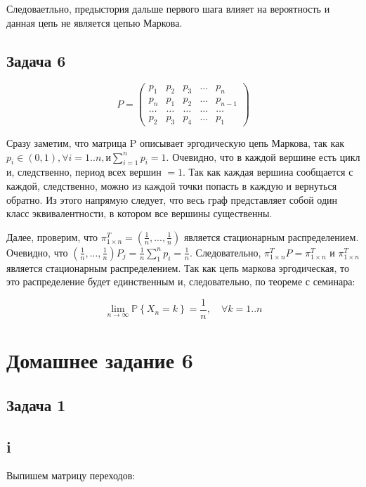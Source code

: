 \documentclass[a4paper,12pt]{article}
\begin{document}
Следоваетльно, предыстория дальше первого шага влияет на вероятность и данная цепь не является цепью Маркова.

\subsection{Задача 6}

\[
P=\left(\begin{array}{ccccc}{p_{1}} & {p_{2}} & {p_{3}} & {\dots} & {p_{n}} \\ {p_{n}} & {p_{1}} & {p_{2}} & {\dots} & {p_{n-1}} \\ {\dots} & {\dots} & {\dots} & {\dots} & {\dots} \\ {p_{2}} & {p_{3}} & {p_{4}} & {\dots} & {p_{1}}\end{array}\right)
\]

Сразу заметим, что матрица P описывает эргодическую цепь Маркова, так как $p_{i} \in(0,1), \forall i=1 . . n, \mathrm{и} \sum_{i=1}^{n} p_{i}=1$. Очевидно, что в каждой вершине есть цикл и, следственно, период всех вершин $ = 1 $. Так как каждая вершина сообщается с каждой, следственно, можно из каждой точки попасть в каждую и вернуться обратно. Из этого напрямую следует, что весь граф представляет собой один класс эквивалентности, в котором все вершины существенны. 

Далее, проверим, что $ \pi_{1\times n}^T = (\frac{1}{n}, ... , \frac{1}{n}) $ является стационарным распределением. Очевидно, что $ (\frac{1}{n}, ... , \frac{1}{n}) P_j = \frac{1}{n} \sum_{1}^{n} p_{i} = \frac{1}{n} $. Следовательно,  $ \pi_{1\times n}^T P =  \pi_{1\times n}^T $ и  $ \pi_{1\times n}^T $ является стационарным распределением. Так как цепь маркова эргодическая, то это распределение будет единственным и, следовательно, по теореме с семинара:

\[
\lim _{n \rightarrow \infty} \mathbb{P}\left\{X_{n}=k\right\}=\frac{1}{n}, \quad \forall k=1 . . n
\]


\section{Домашнее задание 6}

\subsection{Задача 1}

\subsection{i}
Выпишем матрицу переходов:
\end{document}
